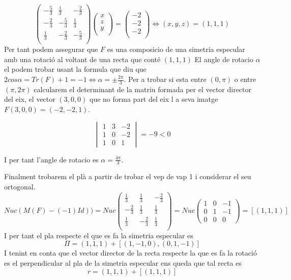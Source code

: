 \documentclass[12pt, a4papre]{article}
\begin{document}
	\[
	\begin{pmatrix}
		-\frac{5}{3}	&	\frac{1}{3}		&	-\frac{2}{3}\\
		-\frac{2}{3}	&	-\frac{5}{3}	&	\frac{1}{3}	\\
		\frac{1}{3}		&	-\frac{2}{3}  	&	-\frac{5}{3}\\
	\end{pmatrix}
	\begin{pmatrix}
		x\\
		z\\
		y\\
	\end{pmatrix}
	=
	\begin{pmatrix}
		-2\\
		-2\\
		-2\\
	\end{pmatrix}
	\iff
	(x,y,z)=(1,1,1)
	\]
	Per tant podem assegurar que $F$ es una composicio de una simetria especular amb una rotació al voltant de una recta que conté $(1,1,1)$
	El angle de rotacio $\alpha$ el podem trobar usant la formula que diu que $2cos\alpha=Tr(F)+1=-1\iff \alpha=\pm\frac{2\pi}{3}$.
	Per a trobar si esta entre $(0,\pi)$ o entre $(\pi,2\pi)$ calcularem el determinant de la matriu formada per el vector director del eix, el vector $(3,0,0)$
	que no forma part del eix l a seva imatge $F(3,0,0)=(-2,-2,1)$.
	
	\[
	\begin{vmatrix}
		1	&	3	&	-2\\
		1	&	0	&	-2\\
		1	&	0  	&	1
	\end{vmatrix}
	=
	-9<0
	\]
	
	I per tant l'angle de rotacio es $\alpha=\frac{4\pi}{3}$.
	
	Finalment trobarem el plà a partir de trobar el vep de vap 1 i considerar el seu ortogonal.
	\[
	Nuc(M(F)-(-1)Id))=Nuc
	\begin{pmatrix}
		\frac{1}{3}		&	\frac{1}{3}		&	-\frac{2}{3}\\
		-\frac{2}{3}	&	\frac{1}{3}		&	\frac{1}{3}	\\
		\frac{1}{3}		&	-\frac{2}{3}  	&	\frac{1}{3}	\\
	\end{pmatrix}
	=
	Nuc
	\begin{pmatrix}
		1	&	0	&	-1\\
		0	&	1	&	-1\\
		0	&	0  	&	0
	\end{pmatrix}
	=[(1,1,1)]
	\]
	I per tant el pla respecte el que es fa la simetria especular es 
	\[
	\Pi=(1,1,1)+[(1,-1,0),(0,1,-1)]
	\]
	I tenint en conta que el vector director de la recta respecte la que es fa la rotació es el perpendicular al pla de la simetria especular 
	ens queda que tal recta es
	\[
	r=(1,1,1) + [(1,1,1)]
	\]
	\\
	
\end{document}
